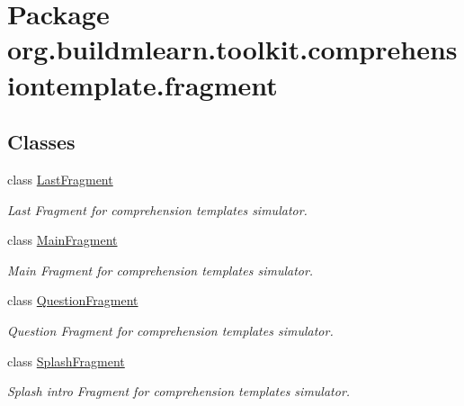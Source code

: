 \hypertarget{namespaceorg_1_1buildmlearn_1_1toolkit_1_1comprehensiontemplate_1_1fragment}{}\section{Package org.\+buildmlearn.\+toolkit.\+comprehensiontemplate.\+fragment}
\label{namespaceorg_1_1buildmlearn_1_1toolkit_1_1comprehensiontemplate_1_1fragment}
\subsection*{Classes}
\begin{DoxyCompactItemize}
\item 
class \hyperlink{classorg_1_1buildmlearn_1_1toolkit_1_1comprehensiontemplate_1_1fragment_1_1LastFragment}{Last\+Fragment}
\begin{DoxyCompactList}\small\item\em Last Fragment for comprehension template\textquotesingle{}s simulator. \end{DoxyCompactList}\item 
class \hyperlink{classorg_1_1buildmlearn_1_1toolkit_1_1comprehensiontemplate_1_1fragment_1_1MainFragment}{Main\+Fragment}
\begin{DoxyCompactList}\small\item\em Main Fragment for comprehension template\textquotesingle{}s simulator. \end{DoxyCompactList}\item 
class \hyperlink{classorg_1_1buildmlearn_1_1toolkit_1_1comprehensiontemplate_1_1fragment_1_1QuestionFragment}{Question\+Fragment}
\begin{DoxyCompactList}\small\item\em Question Fragment for comprehension template\textquotesingle{}s simulator. \end{DoxyCompactList}\item 
class \hyperlink{classorg_1_1buildmlearn_1_1toolkit_1_1comprehensiontemplate_1_1fragment_1_1SplashFragment}{Splash\+Fragment}
\begin{DoxyCompactList}\small\item\em Splash intro Fragment for comprehension template\textquotesingle{}s simulator. \end{DoxyCompactList}\end{DoxyCompactItemize}
